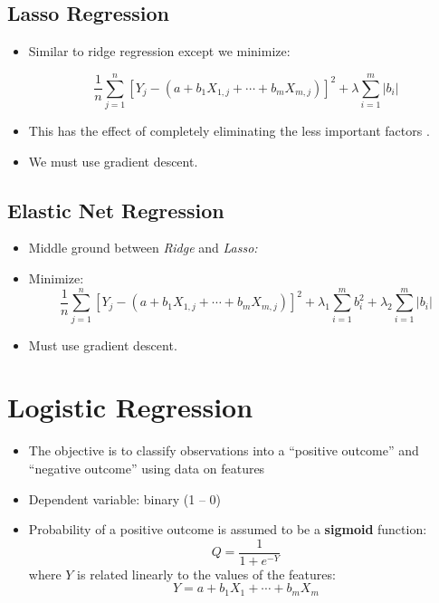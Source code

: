\subsection{Lasso Regression}

\begin{itemize}
    \item Similar to ridge regression except we minimize:
          
          \begin{equation*}
              \frac{1}{n}\sum\limits _{j=1}^{n}\left[ Y_{j} -\left(a+b_{1} X_{1,j} +\cdots +b_{m} X_{m,j}\right)\right]^{2} +\lambda \sum _{i=1}^{m}\left| b_{i}\right| 
          \end{equation*}
    \item This has the effect of completely eliminating the less important factors .
    \item We must use gradient descent.
\end{itemize}

\subsection{Elastic Net Regression}

\begin{itemize}
    \item Middle ground between \textit{Ridge} and \textit{Lasso:}
    \item Minimize:
          \begin{equation*}
              \frac{1}{n}\sum\limits _{j=1}^{n}[ Y_{j} -(a+b_{1} X_{1,j} +\cdots +b_{m} X_{m,j})]^{2} +\lambda _{1}\sum _{i=1}^{m} b_{i}^{2} +\lambda _{2}\sum _{i=1}^{m}| b_{i}| 
          \end{equation*}
    \item Must use gradient descent.
\end{itemize}

\section{Logistic Regression}

\begin{itemize}
    \item The objective is to classify observations into a ``positive outcome'' and ``negative outcome'' using data on features
    \item Dependent variable: binary (1 – 0)
    \item Probability of a positive outcome is assumed to be a \textbf{sigmoid} function:
          \begin{equation*}
              Q=\frac{1}{1+e^{-Y}}
          \end{equation*}where $Y$ is related linearly to the values of the features:
          \begin{equation*}
              Y=a+b_{1} X_{1} +\cdots +b_{m} X_{m}
          \end{equation*}          
\end{itemize}

